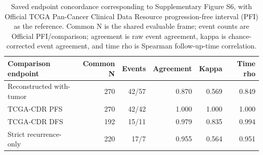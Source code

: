 \begin{table}[htbp]
\centering
\small
\caption{Saved endpoint concordance corresponding to Supplementary Figure S6, with Official TCGA Pan-Cancer Clinical Data Resource progression-free interval (PFI) as the reference. Common N is the shared evaluable frame; event counts are Official PFI/comparison; agreement is raw event agreement, kappa is chance-corrected event agreement, and time rho is Spearman follow-up-time correlation.}
\label{tab:supp-endpoint-concordance}
\begin{tabular}{@{}lrrrrr@{}}
\toprule
Comparison endpoint & Common N & Events & Agreement & Kappa & Time rho \\
\midrule
Reconstructed with-tumor & 270 & 42/57 & 0.870 & 0.569 & 0.849 \\
TCGA-CDR PFS & 270 & 42/42 & 1.000 & 1.000 & 1.000 \\
TCGA-CDR DFS & 192 & 15/11 & 0.979 & 0.835 & 0.994 \\
Strict recurrence-only & 220 & 17/7 & 0.955 & 0.564 & 0.951 \\
\bottomrule
\end{tabular}
\end{table}
